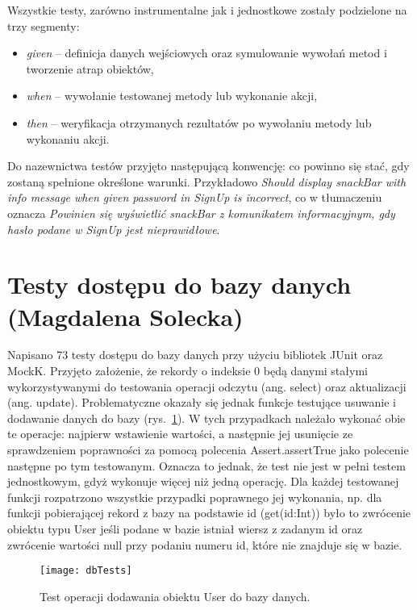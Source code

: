 \par Wszystkie testy, zarówno instrumentalne jak i jednostkowe zostały podzielone na trzy segmenty:
\begin{itemize}
\item \textit{given} -- definicja danych wejściowych oraz symulowanie wywołań metod i tworzenie atrap obiektów,
\item \textit{when} -- wywołanie testowanej metody lub wykonanie akcji,
\item \textit{then} -- weryfikacja otrzymanych rezultatów po wywołaniu metody lub wykonaniu akcji.
\end{itemize}
Do nazewnictwa testów przyjęto następującą konwencję: co powinno się stać, gdy zostaną spełnione określone warunki. Przykładowo \textit{Should display snackBar with info message when given password in SignUp is incorrect}, co w tłumaczeniu oznacza \textit{Powinien się wyświetlić snackBar z komunikatem informacyjnym, gdy hasło podane w SignUp jest nieprawidłowe}.

\FloatBarrier

\section{Testy dostępu do bazy danych (Magdalena Solecka)}
\par Napisano 73 testy dostępu do bazy danych przy użyciu bibliotek JUnit\cite{JUnit} oraz MockK\cite{MockK}. Przyjęto założenie, że rekordy o indeksie 0 będą danymi stałymi wykorzystywanymi do testowania operacji odczytu (ang. select) oraz aktualizacji (ang. update). Problematyczne okazały się jednak funkcje testujące usuwanie i dodawanie danych do bazy (rys.~\ref{fig:dbTests}). W tych przypadkach należało wykonać obie te operacje: najpierw wstawienie wartości, a następnie jej usunięcie ze sprawdzeniem poprawności za pomocą polecenia Assert.assertTrue jako polecenie następne po tym testowanym. Oznacza to jednak, że test nie jest w pełni testem jednostkowym, gdyż wykonuje więcej niż jedną operację. Dla każdej testowanej funkcji rozpatrzono wszystkie przypadki poprawnego jej wykonania, np. dla funkcji pobierającej rekord z bazy na podstawie id (get(id:Int)) było to zwrócenie obiektu typu User jeśli podane w bazie istniał wiersz z zadanym id oraz zwrócenie wartości null przy podaniu numeru id, które nie znajduje się w bazie. 

\begin{figure}[h]
\centering
\texttt{[image: dbTests]}
\caption{Test operacji dodawania obiektu User do bazy danych.}
\label{fig:dbTests}
\end{figure}
\FloatBarrier

